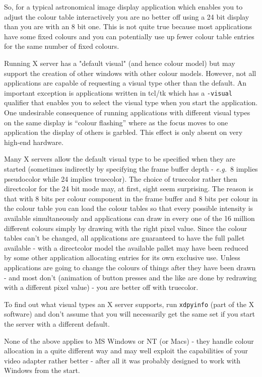 \documentclass[twoside,11pt]{article}
\begin{document}
So, for a typical astronomical image display application which enables you
to adjust the colour table interactively you are no better off using a 24
bit display than you are with an 8 bit one. This is not quite true because
most applications have some fixed colours and you can potentially use up
fewer colour table entries for the same number of fixed colours.

Running X server has a "default visual" (and hence colour model) but may
support the creation of other windows with other colour models. However,
not all applications are capable of requesting a visual type other than
the default. An important exception is applications written in tcl/tk
which has a {\tt -visual} qualifier that enables you to select the visual type
when you start the application. One undesirable consequence of running
applications with different visual types on the same display is ``colour
flashing'' where as the focus moves to one application the display of
others is garbled. This effect is only absent on very high-end hardware. 

Many X servers allow the default visual type to be specified when they are
started (sometimes indirectly by specifying the frame buffer depth - {\em e.g.\ }8 implies pseudocolor while 24 implies truecolor). The choice of
truecolor rather then directcolor for the 24 bit mode may, at first,
sight seem surprising. The reason is that with 8 bits per colour component
in the frame buffer and 8 bits per colour in the colour table you can load
the colour tables so that every possible intensity is available
simultaneously and applications can draw in every one of the 16 million
different colours simply by drawing with the right pixel value.  Since the
colour tables can't be changed, all applications are guaranteed to have
the full pallet available - with a directcolor model the available
pallet may have been reduced by some other application allocating entries
for its own exclusive use. Unless applications are going to change the
colours of things after they have been drawn - and most don't (animation
of button presses and the like are done by redrawing with a different
pixel value) - you are better off with truecolor.

To find out what visual types an X server supports, run {\tt xdpyinfo} (part of
the X software) and don't assume that you will necessarily get the same
set if you start the server with a different default.

None of the above applies to MS Windows or NT (or Macs) - they
handle colour allocation in a quite different way and may well exploit the
capabilities of your video adapter rather better - after all it was
probably designed to work with Windows from the start.
\end{document}
